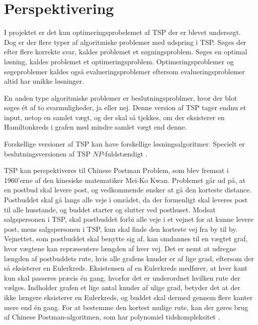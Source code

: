 \chapter{Perspektivering}
I projektet er det kun optimeringsprobelemet af TSP der er blevet undersøgt. Dog er der flere typer af algoritmiske problemer med udspring i TSP. 
Søges der efter flere korrekte svar, kaldes problemet et søgningsproblem. Søges en optimal løsning, kaldes problemet et optimeringsproblem. 
Optimeringsproblemer og søgeproblemer kaldes også evalueringsproblemer eftersom evalueringsproblemer altid har unikke løsninger.

En anden type algoritmiske problemer er beslutningsproblmer, hvor der blot søges ét af to svarmuligheder, ja eller nej. 
Denne version af TSP tager endnu et input, netop en samlet vægt, og der skal så tjekkes, om der eksisterer en Hamiltonkreds i grafen med mindre samlet vægt end denne.

Forskellige versioner af TSP kan have forskellige løsningsalgoritmer. 
Specielt er beslutningsversionen af TSP $NP$-fuldstændigt \citep{complex}.

TSP kan perspektiveres til Chinese Postman Problem, som blev fremsat i 1960'erne af den kinesiske matematiker Mei-Ko Kwan. 
Problemet går ud på, at en postbud skal levere post, og vedkommende ønsker at gå den korteste distance. 
Postbuddet skal gå langs alle veje i området, da der formenligt skal leveres post til alle husstande, og buddet starter og slutter ved posthuset. 
Modsat salgspersonen i TSP, skal postbuddet forbi alle veje i et vejnet for at kunne levere post, mens salgspersonen i TSP, kun skal finde den korteste vej fra by til by. 
Vejnettet, som postbuddet skal benytte sig af, kan omdannes til en vægtet graf, hvor vægtene kan repræsentere længden af hver vej. 
Det er nemt at udregne længden af postbuddets rute, hvis alle grafens knuder er af lige grad, eftersom der så eksisterer en Eulerkreds. 
Eksistensen af en Eulerkreds medfører, at hver kant kun skal passeres præcis én gang, hvorfor det er underordnet hvilken rute der vælges.   
Indholder grafen et lige antal knuder af ulige grad, betyder det at der ikke længere eksisterer en Eulerkreds, og buddet skal dermed gennem flere kanter mere end én gang. 
For at bestemme den kortest mulige rute, kan der gøres brug af Chinese Postman-algoritmen, som har polynomiel tidskompleksitet  \citep{dmat}.